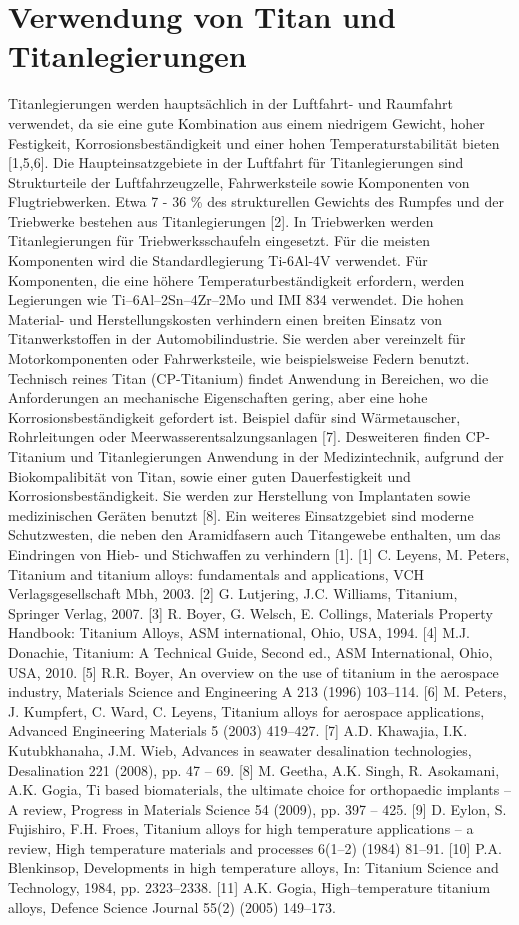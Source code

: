 \section{Verwendung von Titan und Titanlegierungen 	}
Titanlegierungen werden hauptsächlich in der Luftfahrt- und Raumfahrt verwendet, da sie eine gute Kombination aus einem niedrigem Gewicht, hoher Festigkeit, Korrosionsbeständigkeit und einer hohen Temperaturstabilität bieten [1,5,6]. Die Haupteinsatzgebiete in der Luftfahrt für Titanlegierungen sind Strukturteile der Luftfahrzeugzelle, Fahrwerksteile sowie Komponenten von Flugtriebwerken. Etwa 7 - 36 \% des strukturellen Gewichts des Rumpfes und der Triebwerke bestehen aus Titanlegierungen [2]. In Triebwerken werden Titanlegierungen für Triebwerksschaufeln eingesetzt. Für die meisten Komponenten wird die Standardlegierung Ti-6Al-4V verwendet. Für Komponenten, die eine höhere Temperaturbeständigkeit erfordern, werden Legierungen wie Ti–6Al–2Sn–4Zr–2Mo und IMI 834 verwendet. Die hohen Material- und Herstellungskosten verhindern einen breiten Einsatz von Titanwerkstoffen in der Automobilindustrie. Sie werden aber vereinzelt für Motorkomponenten oder Fahrwerksteile, wie beispielsweise Federn benutzt. Technisch reines Titan (CP-Titanium) findet Anwendung in Bereichen, wo die Anforderungen an mechanische Eigenschaften gering, aber eine hohe Korrosionsbeständigkeit gefordert ist. Beispiel dafür sind Wärmetauscher, Rohrleitungen oder Meerwasserentsalzungsanlagen [7]. Desweiteren finden CP-Titanium und Titanlegierungen Anwendung in der Medizintechnik, aufgrund der Biokompalibität von Titan, sowie einer guten Dauerfestigkeit und Korrosionsbeständigkeit. Sie werden zur Herstellung von Implantaten sowie medizinischen Geräten benutzt [8]. Ein weiteres Einsatzgebiet sind moderne Schutzwesten, die neben den Aramidfasern auch Titangewebe enthalten, um das Eindringen von Hieb- und Stichwaffen zu verhindern [1]. 
[1] C. Leyens, M. Peters, Titanium and titanium alloys: fundamentals and applications, VCH Verlagsgesellschaft Mbh, 2003. [2] G. Lutjering, J.C. Williams, Titanium, Springer Verlag, 2007. [3] R. Boyer, G. Welsch, E. Collings, Materials Property Handbook: Titanium Alloys, ASM international, Ohio, USA, 1994. [4] M.J. Donachie, Titanium: A Technical Guide, Second ed., ASM International, Ohio, USA, 2010. [5] R.R. Boyer, An overview on the use of titanium in the aerospace industry, Materials Science and Engineering A 213 (1996) 103–114. [6] M. Peters, J. Kumpfert, C. Ward, C. Leyens, Titanium alloys for aerospace applications, Advanced Engineering Materials 5 (2003) 419–427. [7] A.D. Khawajia, I.K. Kutubkhanaha, J.M. Wieb, Advances in seawater desalination technologies, Desalination 221 (2008), pp. 47 – 69. [8] M. Geetha, A.K. Singh, R. Asokamani, A.K. Gogia, Ti based biomaterials, the ultimate choice for orthopaedic implants – A review, Progress in Materials Science 54 (2009), pp. 397 – 425. [9] D. Eylon, S. Fujishiro, F.H. Froes, Titanium alloys for high temperature applications – a review, High temperature materials and processes 6(1–2) (1984) 81–91. [10] P.A. Blenkinsop, Developments in high temperature alloys, In: Titanium Science and Technology, 1984, pp. 2323–2338. [11] A.K. Gogia, High–temperature titanium alloys, Defence Science Journal 55(2) (2005) 149–173. 


